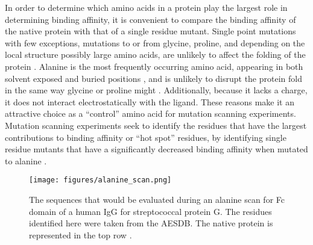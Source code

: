 In order to determine which amino acids in a protein play the largest role in determining binding affinity, it is convenient to compare the binding affinity of the native protein with that of a single residue mutant.
Single point mutations with few exceptions, mutations to or from glycine, proline, and depending on the local structure possibly large amino acids, are unlikely to affect the folding of the protein \cite{illergaard2009structure,betts2003amino}.
Alanine is the most frequently occurring amino acid, appearing in both solvent exposed and buried positions \cite{chothia1976nature,rose1985hydrophobicity}, and is unlikely to disrupt the protein fold in the same way glycine or proline might \cite{klapper1977independent,betts2003amino}.
Additionally, because it lacks a charge, it does not interact electrostatically with the ligand.
These reasons make it an attractive choice as a ``control'' amino acid for mutation scanning experiments.
Mutation scanning experiments seek to identify the residues that have the largest contributions to binding affinity or ``hot spot'' residues, by identifying single residue mutants that have a significantly decreased binding affinity when mutated to alanine \cite{cunningham1989high}.
\begin{figure}[h]
\centering
\texttt{[image: figures/alanine\_scan.png]}
\caption{The sequences that would be evaluated during an alanine scan for Fc domain of a human IgG for streptococcal protein G.
The residues identified here were taken from the AESDB.
The native protein is represented in the top row \protect\cite{sauer1995crystal,thorn2001asedb}.}
\label{fig:alanine_scan}
\end{figure}

